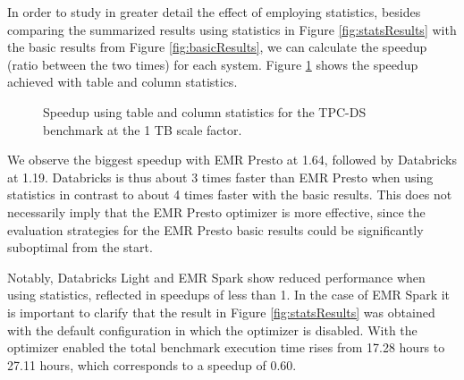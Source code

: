 In order to study in greater detail the effect of employing statistics, besides comparing the summarized results using statistics in Figure \ref{fig:statsResults} with the basic results from Figure \ref{fig:basicResults}, we can calculate the speedup (ratio between the two times) for each system. Figure \ref{fig:statsSpeedup} shows the speedup achieved with table and column statistics.

\begin{figure}
   \begin{center}
   \end{center}
   \caption{Speedup using table and column statistics for the TPC-DS benchmark at the 1 TB scale factor.}
   \label{fig:statsSpeedup}
\end{figure}

We observe the biggest speedup with EMR Presto at 1.64, followed by Databricks at 1.19. Databricks is thus about 3 times faster than EMR Presto when using statistics in contrast to about 4 times faster with the basic results. This does not necessarily imply that the EMR Presto optimizer is more effective, since the evaluation strategies for the EMR Presto basic results could be significantly suboptimal from the start.

Notably, Databricks Light and EMR Spark show reduced performance when using statistics, reflected in speedups of less than 1. In the case of EMR Spark it is important to clarify that the result in Figure \ref{fig:statsResults} was obtained with the default configuration in which the optimizer is disabled. With the optimizer enabled the total benchmark execution time rises from 17.28 hours to 27.11 hours, which corresponds to a speedup of 0.60.








